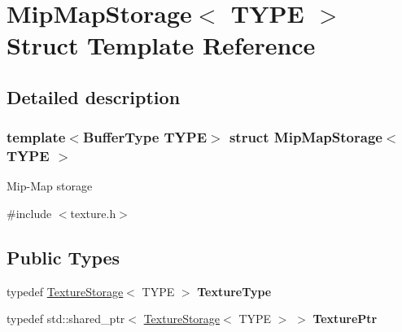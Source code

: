 \hypertarget{struct_mip_map_storage}{}\section{Mip\+Map\+Storage$<$ T\+Y\+PE $>$ Struct Template Reference}
\label{struct_mip_map_storage}


\subsection{Detailed description}
\subsubsection*{template$<$Buffer\+Type T\+Y\+PE$>$\newline
struct Mip\+Map\+Storage$<$ T\+Y\+P\+E $>$}

Mip-\/\+Map storage

\label{struct_mip_map_storage_MipMapStorage}%
%


{\ttfamily \#include $<$texture.\+h$>$}

\subsection*{Public Types}
\begin{DoxyCompactItemize}
\item 
\mbox{\label{struct_mip_map_storage_aab6d06e9eabd5c92089b88cbfc9d35ac}} 
typedef \hyperlink{struct_texture_storage}{Texture\+Storage}$<$ T\+Y\+PE $>$ {\bfseries Texture\+Type}
\item 
\mbox{\label{struct_mip_map_storage_a533144637a590e50df0ec2941002f385}} 
typedef std\+::shared\+\_\+ptr$<$ \hyperlink{struct_texture_storage}{Texture\+Storage}$<$ T\+Y\+PE $>$ $>$ {\bfseries Texture\+Ptr}
\end{DoxyCompactItemize}
